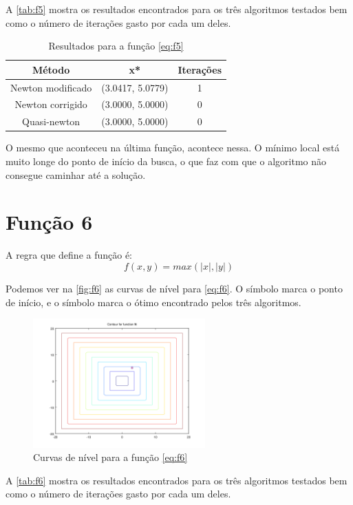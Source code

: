 \documentclass[12pt]{article}
\begin{document}
A \autoref{tab:f5} mostra os resultados encontrados para os três algoritmos testados bem como o número de iterações gasto por cada um deles.

\begin{table}[H]
\centering
\begin{tabular}{*3c}
\toprule
Método			&	x*		&	Iterações\\
\midrule
Newton modificado	&	(3.0417, 5.0779)	&	1\\
Newton corrigido	&	(3.0000, 5.0000)	&	0\\
Quasi-newton		&	(3.0000, 5.0000)	&	0\\
\bottomrule
\end{tabular}
\caption{\small{Resultados para a função \autoref{eq:f5} }}
\label{tab:f5}
\end{table}

O mesmo que aconteceu na última função, acontece nessa. O mínimo local está muito longe do ponto de início da busca, o que faz com que
o algoritmo não consegue caminhar até a solução.

\section{Função 6}
A regra que define a função é:
\begin{equation}
\label{eq:f6}
f(x, y) = max(|x|, |y|)
\end{equation}

Podemos ver na \autoref{fig:f6} as curvas de nível para \autoref{eq:f6}. O símbolo \textit{\textopenbullet} marca o ponto de início,
e o símbolo \textit{\texttimes} marca o ótimo encontrado pelos três algoritmos.

\begin{figure}[H]
  \centering
  \includegraphics[width=250px]{../matlab/images/f6_contour}
  \caption{Curvas de nível para a função \autoref{eq:f6}}
  \label{fig:f6}
\end{figure}

A \autoref{tab:f6} mostra os resultados encontrados para os três algoritmos testados bem como o número de iterações gasto por cada um deles.
\end{document}
